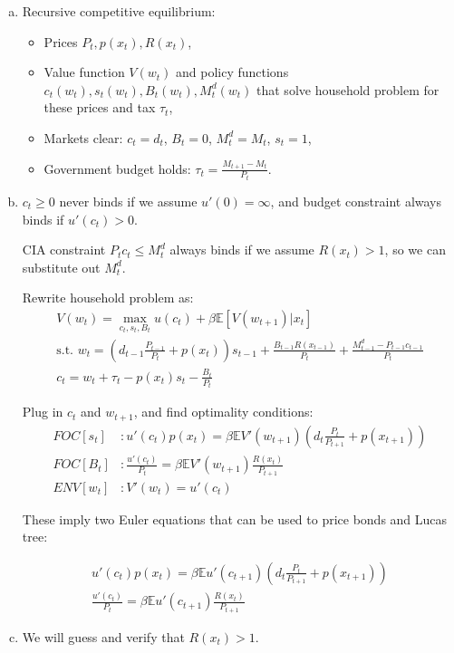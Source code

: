 \documentclass{article}
\newcommand{\E}{\mathbb{E}}
\begin{document}
\begin{enumerate}[(a)]
\item Recursive competitive equilibrium:
  \begin{itemize}
  \item Prices $P_t,p(x_t),R(x_{t})$,
  \item Value function $V(w_t)$ and policy functions
    $c_t(w_t),s_t(w_t),B_t(w_t),M_t^d(w_t)$ that solve household
    problem for these prices and tax $\tau_t$,
  \item Markets clear: $c_t=d_t$, $B_t=0$, $M_t^d=M_t$, $s_t=1$,
  \item Government budget holds: $\tau_t=\frac{M_{t+1}-M_t}{P_t}$.
  \end{itemize}

\item $c_t\ge 0$ never binds if we assume $u'(0)=\infty$, and budget
  constraint always binds if $u'(c_t)>0$.

  CIA constraint $P_tc_t\le M_t^d$ always binds if we assume
  $R(x_t)>1$, so we can substitute out $M_t^d$.

  Rewrite household problem as:
  \begin{gather*}
    V(w_t)=\max_{c_t,s_t,B_t} u(c_t)+\beta\E[V(w_{t+1})|x_t]\\
    \text{s.t. } w_t =
    (d_{t-1}\frac{P_{t-1}}{P_t}+p(x_t))s_{t-1}+\frac{B_{t-1}R(x_{t-1})}{P_t}+\frac{M_{t-1}^d-P_{t-1}c_{t-1}}{P_t}\\
    c_t=w_t+\tau_t-p(x_t)s_t-\frac{B_t}{P_t}
  \end{gather*}

  Plug in $c_t$ and $w_{t+1}$, and find optimality conditions:
  \begin{align*}
    FOC[s_t]&:u'(c_t)p(x_t)=\beta\E V'(w_{t+1})(d_{t}\frac{P_{t}}{P_{t+1}}+p(x_{t+1}))\\
    FOC[B_t]&:\frac{u'(c_t)}{P_t}=\beta\E V'(w_{t+1})\frac{R(x_{t})}{P_{t+1}}\\
    ENV[w_t]&:V'(w_t)=u'(c_t)
  \end{align*}

  These imply two Euler equations that can be used to price bonds and
  Lucas tree:

  \begin{gather}
    u'(c_t)p(x_t)=\beta\E u'(c_{t+1})(d_{t}\frac{P_{t}}{P_{t+1}}+p(x_{t+1}))\label{eq:ees}\tag{$EE_s$}\\
    \frac{u'(c_t)}{P_t}=\beta\E u'(c_{t+1})\frac{R(x_{t})}{P_{t+1}}\label{eq:eeb}\tag{$EE_B$}
  \end{gather}

\item We will guess and verify that $R(x_t)>1$.


\end{enumerate}
\end{document}
